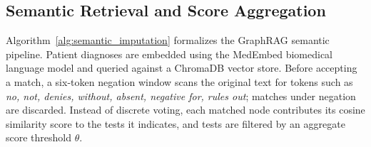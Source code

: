 \subsection*{Semantic Retrieval and Score Aggregation}
\label{app:semantic_matching}

Algorithm~\ref{alg:semantic_imputation} formalizes the GraphRAG semantic
pipeline. Patient diagnoses are embedded using the MedEmbed biomedical language
model and queried against a ChromaDB vector store. Before accepting a match, a
six-token negation window scans the original text for tokens such as \textit{no,
not, denies, without, absent, negative for, rules out}; matches under negation
are discarded. Instead of discrete voting, each matched node contributes its
cosine similarity score to the tests it indicates, and tests are filtered by an
aggregate score threshold $\theta$.

